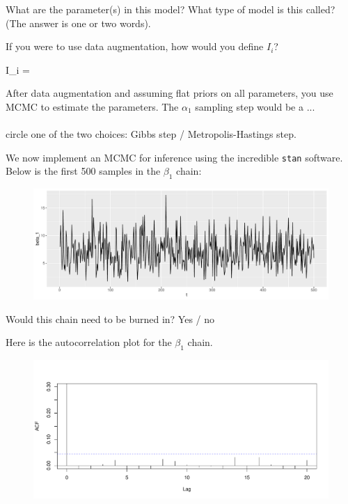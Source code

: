 \documentclass[12pt]{article}
\begin{document}
\begin{enumerate}
 What are the parameter(s) in this model?
 What type of model is this called? (The answer is one or two words).

 If you were to use data augmentation, how would you define $I_i$?

\beqn
\hspace{-1.5cm}I_i = \hspace{5in}
\eeqn 
~

 After data augmentation and assuming flat priors on all parameters, you use MCMC to estimate the parameters. The $\alpha_1$ sampling step would be a ...  \\~\\ circle one of the two choices: Gibbs step / Metropolis-Hastings step.


We now implement an MCMC for inference using the incredible \texttt{stan} software. Below is the first 500 samples in the $\beta_1$ chain:

\begin{figure}[htp]
\centering
\includegraphics[width=6in]{beta_1}
\end{figure}

 Would this chain need to be burned in? Yes / no 

Here is the autocorrelation plot for the $\beta_1$ chain.

\vspace{-0.5cm}
\begin{figure}[htp]
\centering
\includegraphics[width=6in]{beta_1_acf}
\end{figure}
\vspace{-0.5cm}


\end{enumerate}
\end{document}
